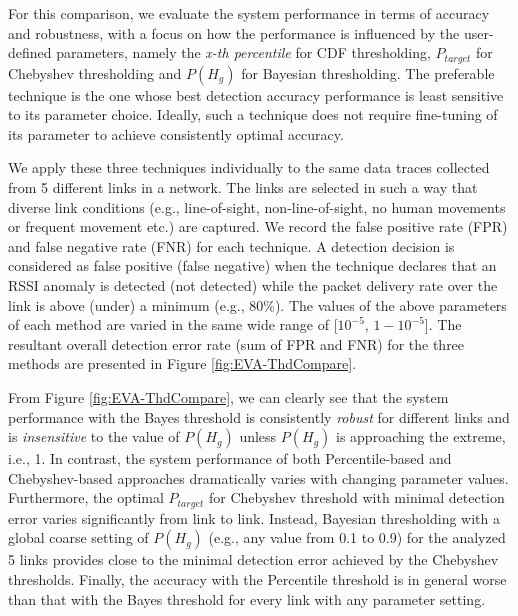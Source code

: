 

For this comparison, we evaluate the system performance in terms of accuracy and robustness, with a focus on how the performance is influenced by the user-defined parameters, namely the \textit{x-th percentile} for CDF thresholding, $P_{target}$ for Chebyshev thresholding and $P(H_g)$ for Bayesian thresholding. The preferable technique is the one whose best detection accuracy performance is least sensitive to its parameter choice. Ideally, such a technique does not require fine-tuning of its parameter to achieve consistently optimal accuracy. 

We apply these three techniques individually to the same data traces collected from 5 different links in a network. The links are selected in such a way that diverse link conditions (e.g., line-of-sight,  non-line-of-sight, no human movements or frequent movement etc.) are captured. We record the false positive rate (FPR) and false negative rate (FNR) for each technique. A detection decision is considered as false positive (false negative) when the technique declares that an RSSI anomaly is detected (not detected) while the packet delivery rate over the link is above (under) a minimum (e.g., 80\%). The values of the above parameters of each method are varied in the same wide range of [$10^{-5}$, $1-10^{-5}$]. The resultant overall detection error rate (sum of FPR and FNR) for the three methods are presented in Figure \ref{fig:EVA-ThdCompare}.
	
From Figure \ref{fig:EVA-ThdCompare}, we can clearly see that the system performance with the Bayes threshold is consistently \textit{robust} for different links and is \textit{insensitive} to the value of $P(H_g)$ unless $P(H_g)$ is approaching the extreme, i.e., 1. 
In contrast, the system performance of both Percentile-based and Chebyshev-based approaches dramatically varies with changing parameter values. Furthermore, the optimal $P_{target}$ for Chebyshev threshold with minimal detection error varies significantly from link to link. Instead, Bayesian thresholding with a global coarse setting of $P(H_g)$ (e.g., any value from 0.1 to 0.9) for the analyzed 5 links provides close to the minimal detection error achieved by the Chebyshev thresholds. Finally, the accuracy with the Percentile threshold is in general worse than that with the Bayes threshold for every link with any parameter setting. 

